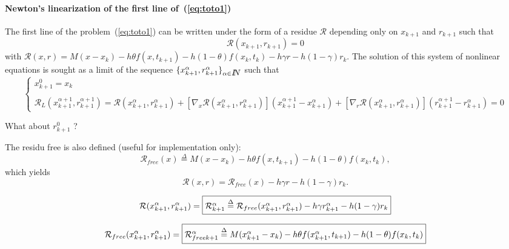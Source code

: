  \paragraph{Newton's linearization of the first line of~(\ref{eq:toto1})} The first line of the  problem~(\ref{eq:toto1}) can be written under the form of a residue $\mathcal R$ depending only on $x_{k+1}$ and $r_{k+1}$ such that 
\begin{equation}
  \label{eq:NL3}
  \mathcal R (x_{k+1},r _{k+1}) =0
\end{equation}
with $\mathcal R(x,r) = M(x - x_{k}) -h\theta f( x , t_{k+1}) - h(1-\theta)f(x_k,t_k) - h\gamma r
- h(1-\gamma)r_k$.
The solution of this system of nonlinear equations is sought as a limit of the sequence $\{ x^{\alpha}_{k+1},r^{\alpha}_{k+1} \}_{\alpha \in \mbox{\rm $I\!\!N$}}$ such that
 \begin{equation}
   \label{eq:NL7}
   \begin{cases}
     x^{0}_{k+1} = x_k \\ \\
     \mathcal R_L( x^{\alpha+1}_{k+1},r^{\alpha+1}_{k+1}) = \mathcal
     R(x^{\alpha}_{k+1},r^{\alpha}_{k+1})  + \left[ \nabla_{x} \mathcal
     R(x^{\alpha}_{k+1},r^{\alpha}_{k+1})\right] (x^{\alpha+1}_{k+1}-x^{\alpha}_{k+1} ) +
     \left[ \nabla_{r} \mathcal R(x^{\alpha}_{k+1},r^{\alpha}_{k+1})\right] (r^{\alpha+1}_{k+1} - r^{\alpha}_{k+1} ) =0
 \end{cases}
\end{equation}
\begin{ndrva}
  What about $r^0_{k+1}$ ?
\end{ndrva}

The residu free is also defined (useful for implementation only):
\[\mathcal R _{free}(x) \stackrel{\Delta}{=}  M(x - x_{k}) -h\theta f( x , t_{k+1}) - h(1-\theta)f(x_k,t_k),\]
which yields
\[\mathcal R (x,r) = \mathcal R _{free}(x)   - h\gamma r - h(1-\gamma)r_k.\]

\begin{equation}
  \mathcal R (x^{\alpha}_{k+1},r^{\alpha}_{k+1}) = \fbox{$\mathcal R^{\alpha}_{k+1} \stackrel{\Delta}{=}  \mathcal R
_{free}(x^{\alpha}_{k+1},r^{\alpha}_{k+1} )  - h\gamma r^{\alpha}_{k+1} - h(1-\gamma)r_k$}\label{eq:rfree-1}
\end{equation}

\[  \mathcal R
_{free}(x^{\alpha}_{k+1},r^{\alpha}_{k+1} )=\fbox{$ \mathcal R _{free k+1} ^{\alpha} \stackrel{\Delta}{=}  M(x^{\alpha}_{k+1} - x_{k}) -h\theta f( x^{\alpha}_{k+1} , t_{k+1}) - h(1-\theta)f(x_k,t_k)$}\]
 
